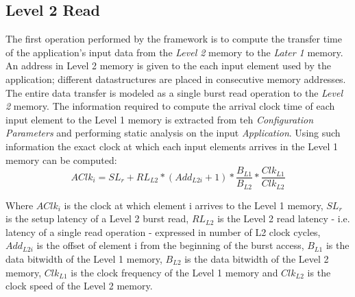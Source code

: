 \subsection{Level 2 Read}
\label{ssec:l2_read_model}
The first operation performed by the framework is to compute the transfer time of the application's input data from the \textit{Level 2} memory to the \textit{Later 1} memory. An address in Level 2 memory is given to the each input element used by the application; different datastructures are placed in consecutive memory addresses. The entire data transfer is modeled as a single burst read operation to the \textit{Level 2} memory. The information required to compute the arrival clock time of each input element to the Level 1 memory is extracted from teh \textit{Configuration Parameters} and performing static analysis on the input \textit{Application}.
Using such information  the exact clock at which each input elements arrives in the Level 1 memory can be computed:
$$
AClk_i = SL_r + RL_{L2} * (Add_{L2i}+1) * \frac{B_{L1}}{B_{L2}} * \frac{Clk_{L1}}{Clk_{L2}}
$$

Where $AClk_i$ is the clock at which element i arrives to the Level 1 memory, $SL_r$ is the setup latency of a Level 2 burst read, $RL_{L2}$ is the Level 2 read latency - i.e. latency of a single read operation - expressed in number of L2 clock cycles, $Add_{L2i}$ is the offset of element i from the beginning of the burst access, $B_{L1}$ is the data bitwidth of the Level 1 memory, $B_{L2}$ is the data bitwidth of the Level 2 memory, $Clk_{L1}$ is the clock frequency of the Level 1 memory and $Clk_{L2}$ is the clock speed of the Level 2 memory.

